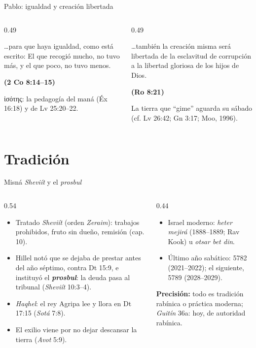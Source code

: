 \documentclass[hyperref={bookmarks=false},aspectratio=169]{beamer}
\newcommand{\grc}[1]{\foreignlanguage{ancientgreek}{#1}}
\newcommand{\fuente}[1]{\par\hfill{\upshape\bfseries\footnotesize\textcolor{tierraroja}{#1}}}
\newcommand{\destacar}[1]{\textbf{\textcolor{tierraroja}{#1}}}
\newcommand{\precision}[1]{{\footnotesize\color{sepia}\textbf{Precisión:} #1}}
\begin{document}
\begin{frame}{Pablo: igualdad y creación libertada}
\begin{columns}[t,onlytextwidth]
\begin{column}{0.49\textwidth}
\begin{cita}\ldots{}para que haya igualdad, como está escrito: El que recogió mucho, no tuvo más, y el que poco, no tuvo menos.\fuente{(2 Co 8:14--15)}\end{cita}
\scriptsize \grc{ἰσότης}: la pedagogía del maná (Éx 16:18) y de Lv 25:20--22.
\end{column}
\begin{column}{0.49\textwidth}
\begin{cita}\ldots{}también la creación misma será libertada de la esclavitud de corrupción a la libertad gloriosa de los hijos de Dios.\fuente{(Ro 8:21)}\end{cita}
\scriptsize La tierra que ``gime'' aguarda su sábado (cf. Lv 26:42; Gn 3:17; Moo, 1996).
\end{column}
\end{columns}
\end{frame}

\section{Tradición}

\begin{frame}{Misná \emph{Sheviít} y el \emph{prosbul}}
\begin{columns}[c,onlytextwidth]
\begin{column}{0.54\textwidth}\small
\begin{itemize}
\item Tratado \emph{Sheviít} (orden \emph{Zeraim}): trabajos prohibidos, fruto sin dueño, remisión (cap. 10).
\item Hillel notó que se dejaba de prestar antes del año séptimo, contra Dt 15:9, e instituyó el \destacar{\emph{prosbul}}: la deuda pasa al tribunal (\emph{Sheviít} 10:3--4).
\item \emph{Haqhel}: el rey Agripa lee y llora en Dt 17:15 (\emph{Sotá} 7:8).
\item El exilio viene por no dejar descansar la tierra (\emph{Avot} 5:9).
\end{itemize}
\end{column}
\begin{column}{0.44\textwidth}\small
\begin{itemize}
\item Israel moderno: \emph{heter mejirá} (1888--1889; Rav Kook) u \emph{otsar bet din}.
\item Último año sabático: 5782 (2021--2022); el siguiente, 5789 (2028--2029).
\end{itemize}
\precision{todo es tradición rabínica o práctica moderna; \emph{Guitín} 36a: hoy, de autoridad rabínica.}
\end{column}
\end{columns}
\end{frame}
\end{document}
